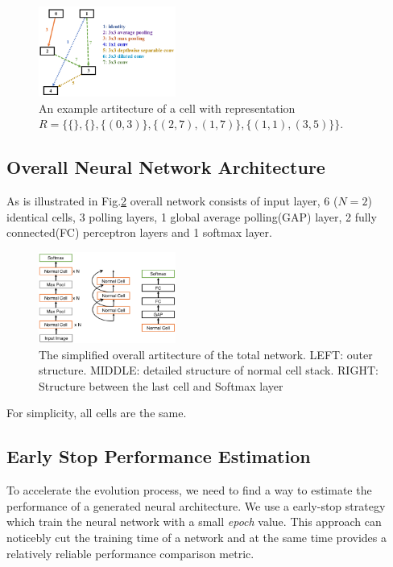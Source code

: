 \documentclass[conference]{IEEEtran}
\begin{document}
  \begin{figure}[H]
 	\centering
 	\includegraphics[width=0.4\textwidth]{figures/cellStruct.png}
   \caption{An example artitecture of a cell with representation $R=\{\{\},\{\},\{(0,3)\},\{(2,7),(1,7)\},\{(1,1),(3,5)\}\}$.}\label{fig:digit}
   \label{f_artc}
  \end{figure}

  \subsection{Overall Neural Network Architecture}
  As is illustrated in Fig.\ref{total_artc} overall network consists of input layer, 6 ($N = 2$) identical cells, 3 polling layers, 1 global average polling(GAP) layer, 2 fully connected(FC) perceptron layers and 1 softmax layer. 

  \begin{figure}[H]
 	\centering
 	\includegraphics[width=0.4\textwidth]{figures/overallStruct.png}
   \caption{The simplified overall artitecture of the total network. LEFT: outer structure. MIDDLE: detailed structure of normal cell stack. RIGHT: Structure between the last cell and Softmax layer}\label{fig:digit}
   \label{total_artc}
  \end{figure}

  For simplicity, all cells are the same. 

  \subsection{Early Stop Performance Estimation}

  To accelerate the evolution process, we need to find a way to estimate the performance of a generated neural architecture. We use a early-stop strategy which train the neural network with a small \emph{epoch} value. This approach can noticebly cut the training time of a network and at the same time provides a relatively reliable performance comparison metric.
\end{document}

